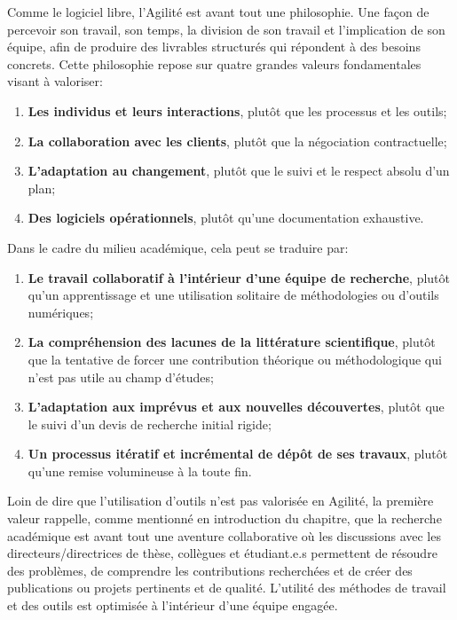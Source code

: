 \documentclass[
  letterpaper,
  DIV=11,
  numbers=noendperiod]{scrreprt}
\providecommand{\tightlist}{%
  \setlength{\itemsep}{0pt}\setlength{\parskip}{0pt}}\usepackage{longtable,booktabs,array}
\begin{document}
Comme le logiciel libre, l'Agilité est avant tout une philosophie. Une
façon de percevoir son travail, son temps, la division de son travail et
l'implication de son équipe, afin de produire des livrables structurés
qui répondent à des besoins concrets. Cette philosophie repose sur
quatre grandes valeurs fondamentales visant à valoriser:

\begin{enumerate}
\def\labelenumi{\arabic{enumi}.}
\tightlist
\item
  \textbf{Les individus et leurs interactions}, plutôt que les processus
  et les outils;
\item
  \textbf{La collaboration avec les clients}, plutôt que la négociation
  contractuelle;
\item
  \textbf{L'adaptation au changement}, plutôt que le suivi et le respect
  absolu d'un plan;
\item
  \textbf{Des logiciels opérationnels}, plutôt qu'une documentation
  exhaustive.
\end{enumerate}

Dans le cadre du milieu académique, cela peut se traduire par:

\begin{enumerate}
\def\labelenumi{\arabic{enumi}.}
\tightlist
\item
  \textbf{Le travail collaboratif à l'intérieur d'une équipe de
  recherche}, plutôt qu'un apprentissage et une utilisation solitaire de
  méthodologies ou d'outils numériques;
\item
  \textbf{La compréhension des lacunes de la littérature scientifique},
  plutôt que la tentative de forcer une contribution théorique ou
  méthodologique qui n'est pas utile au champ d'études;
\item
  \textbf{L'adaptation aux imprévus et aux nouvelles découvertes},
  plutôt que le suivi d'un devis de recherche initial rigide;
\item
  \textbf{Un processus itératif et incrémental de dépôt de ses travaux},
  plutôt qu'une remise volumineuse à la toute fin.
\end{enumerate}

Loin de dire que l'utilisation d'outils n'est pas valorisée en Agilité,
la première valeur rappelle, comme mentionné en introduction du
chapitre, que la recherche académique est avant tout une aventure
collaborative où les discussions avec les directeurs/directrices de
thèse, collègues et étudiant.e.s permettent de résoudre des problèmes,
de comprendre les contributions recherchées et de créer des publications
ou projets pertinents et de qualité. L'utilité des méthodes de travail
et des outils est optimisée à l'intérieur d'une équipe engagée.
\end{document}
